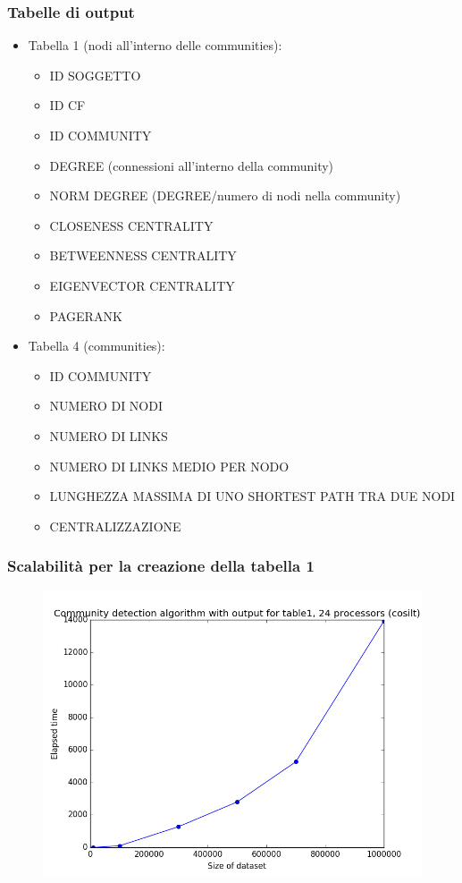 \documentclass{beamer}
\begin{document}
\begin{frame}
 \frametitle{Tabelle di output}
 \begin{itemize}
 \item Tabella 1 (nodi all'interno delle communities):
 \begin{itemize}
\item ID SOGGETTO
\item ID CF
\item ID COMMUNITY
\item DEGREE (connessioni all'interno della community)
\item NORM DEGREE (DEGREE/numero di nodi nella community)
\item CLOSENESS CENTRALITY
\item BETWEENNESS CENTRALITY
\item EIGENVECTOR CENTRALITY
\item PAGERANK
\end{itemize}
 \item Tabella 4 (communities):
 \begin{itemize}
 \item ID COMMUNITY
 \item NUMERO DI NODI
 \item NUMERO DI LINKS
 \item NUMERO DI LINKS MEDIO PER NODO
 \item LUNGHEZZA MASSIMA DI UNO SHORTEST PATH TRA DUE NODI
 \item CENTRALIZZAZIONE
 \end{itemize}
 \end{itemize}

\end{frame}
\begin{frame}
 \frametitle{Scalabilità per la creazione della tabella 1}
  \begin{figure}[htbp]
\centering
\includegraphics[height=6.0 cm,width=10 cm]{24cores_table1.png}

\end{figure}
\end{frame}
\end{document}
